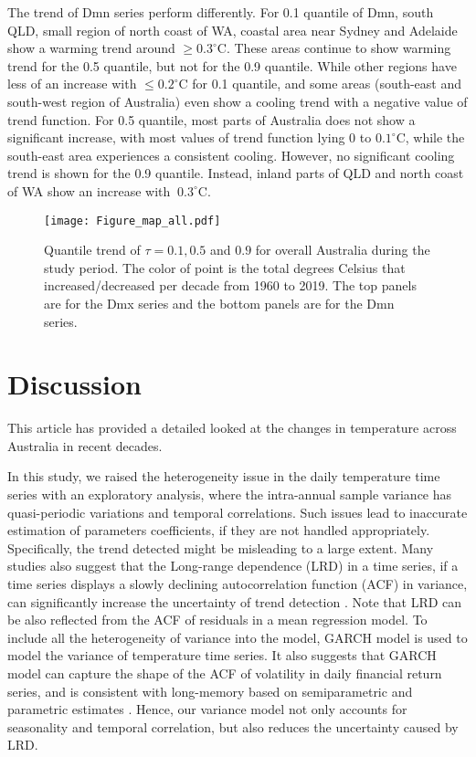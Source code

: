 \documentclass[fleqn,10pt]{wlscirep}
\newcommand{\dc}[1]{#1^{ \circ}\mathrm{C}}
\begin{document}
The trend of Dmn series perform differently. For 0.1 quantile of Dmn,  south QLD, small region of north coast of WA, coastal area near Sydney and Adelaide show a warming trend around $\geq\dc{0.3}$. These areas continue to show warming trend for the 0.5 quantile, but not for the 0.9 quantile. While other regions have less of an increase with $\leq\dc{0.2}$ for 0.1 quantile, and some areas (south-east and south-west region of Australia) even show a cooling trend with a negative value of trend function.
For 0.5 quantile, most parts of Australia does not show a significant increase, with most values of trend function lying 0 to $\dc{0.1}$, while the south-east area experiences a consistent cooling. However, no significant cooling trend is shown for the 0.9 quantile. Instead, inland parts of QLD and north coast of WA show an increase with $~\dc{0.3}$.

\begin{figure}[H]
	\hspace{-1cm} \texttt{[image: Figure\_map\_all.pdf]}
	\caption{Quantile trend of $\tau = 0.1,0.5$ and $0.9$ for overall Australia during the study period.  The color of point is the total degrees Celsius that increased/decreased per decade from 1960 to 2019. The top panels are for the Dmx series and the bottom panels are for the Dmn series. }
	\label{fig.mapsp1}
\end{figure}

\section*{Discussion}


This article has provided a detailed looked at the changes in temperature across Australia in recent decades.

In this study, we raised the heterogeneity issue in the daily temperature time series with an exploratory analysis, where the intra-annual sample variance has quasi-periodic variations and temporal correlations. Such issues lead to inaccurate estimation of parameters coefficients, if they are not handled appropriately. Specifically, the trend detected might be misleading to a large extent. Many studies also suggest that the Long-range
dependence (LRD) in a time series, if a time series displays a slowly declining autocorrelation function (ACF) in variance, can significantly increase the uncertainty of trend detection \cite{yue2002influence,Fatichi2009,Franzke2010,Franzke2012,gao2017quantile}.  Note that LRD can be also reflected from the ACF of residuals in a mean regression model.  To include all the heterogeneity of variance into the model, GARCH model is used to model the variance of temperature time series. It also suggests that GARCH model can capture the shape of the ACF of volatility in daily financial return series, and is consistent with long-memory based on semiparametric and parametric estimates \cite{maheu2005can}. Hence, our variance model not only accounts for seasonality and temporal correlation, but also reduces the uncertainty caused by LRD.
\end{document}
